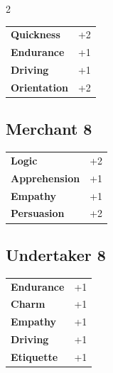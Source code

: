 \begin{multicols}{2}
\begin{tcolorbox}
\begin{tabular}{@{}ll@{}}
    \textbf{Quickness} & +2\\
    \textbf{Endurance} & +1\\
    \textbf{Driving} & +1\\
    \textbf{Orientation} & +2\\
\end{tabular}


\end{tcolorbox}

\begin{tcolorbox}
    \subsection*{Merchant \hfill \small{8 }}
    \tcblower




\begin{tabular}{@{}ll@{}}
    \textbf{Logic} & +2\\
    \textbf{Apprehension} & +1\\
    \textbf{Empathy} & +1\\
    \textbf{Persuasion} & +2\\
\end{tabular}


\end{tcolorbox}

\begin{tcolorbox}
    \subsection*{Undertaker \hfill \small{8 }}
    \tcblower




\begin{tabular}{@{}ll@{}}
    \textbf{Endurance} & +1\\
    \textbf{Charm} & +1\\
    \textbf{Empathy} & +1\\
    \textbf{Driving} & +1\\
    \textbf{Etiquette} & +1\\
\end{tabular}


\end{tcolorbox}
\end{multicols}
